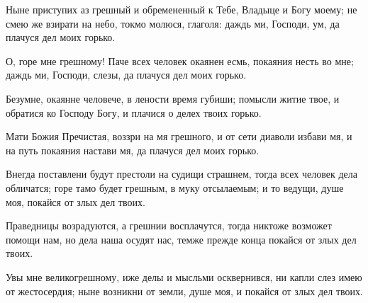 \mychapterending


\begin{mymulticols}





Ныне приступих аз грешный и обремененный к Тебе, Владыце и Богу моему; не смею же взирати на небо, токмо молюся, глаголя: даждь ми, Господи, ум, да плачуся дел моих горько.


О, горе мне грешному! Паче всех человек окаянен есмь, покаяния несть во мне; даждь ми, Господи, слезы, да плачуся дел моих горько.

\slava

Безумне, окаянне человече, в лености время губиши; помысли житие твое, и обратися ко Господу Богу, и плачися о делех твоих горько.

\inyne

Мати Божия Пречистая, воззри на мя грешного, и от сети диаволи избави мя, и на путь покаяния настави мя, да плачуся дел моих горько.




Внегда поставлени будут престоли на судищи страшнем, тогда всех человек дела обличатся; горе тамо будет грешным, в муку отсылаемым; и то ведущи, душе моя, покайся от злых дел твоих.


Праведницы возрадуются, а грешнии восплачутся, тогда никтоже возможет помощи нам, но дела наша осудят нас, темже прежде конца покайся от злых дел твоих.

\slava

Увы мне великогрешному, иже делы и мысльми осквернився, ни капли слез имею от жестосердия; ныне возникни от земли, душе моя, и покайся от злых дел твоих.

\inyne


\end{mymulticols}
